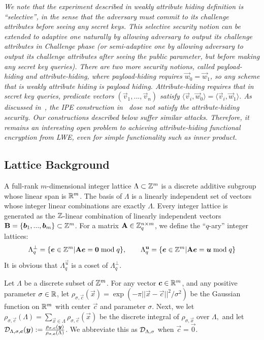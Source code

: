 \begin{remark}\label{rem:sec}
\emph{
We note that the experiment described in weakly attribute hiding definition is ``selective'', in the sense that the adversary must commit to its challenge attributes before seeing any secret keys. This selective security notion can be extended to adaptive one naturally by allowing adversary to output its challenge attributes in Challenge phase (or semi-adaptive one by allowing adversary to output its challenge attributes after seeing the public parameter, but before making any secret key queries). There are two more security notions, called {\em payload-hiding} and {\em attribute-hiding}, where payload-hiding requires $\vec{w}_0 = \vec{w}_1$, so any scheme that is weakly attribute hiding is payload hiding. Attribute-hiding requires that in secret key queries, predicate vectors $(\vec{v}_1,..., \vec{v}_n)$ satisfy $\langle \vec{v}_i, \vec{w}_0 \rangle = \langle \vec{v}_i, \vec{w}_1 \rangle$. As discussed in~\cite{cryptoeprint:2016:654}, the IPE construction in~\cite{AC:AgrFreVai11} dose not satisfy the attribute-hiding security. Our constructions described below suffer similar attacks. Therefore, it remains an interesting open problem to achieving attribute-hiding functional encryption from LWE, even for simple functionality such as inner product.
}
\end{remark}


\subsection{Lattice Background}
A full-rank $m$-dimensional integer lattice $\Lambda\subset\mathbb{Z}^m$ is a discrete additive subgroup whose linear span is $\mathbb{R}^m$. The basis of $\Lambda$ is a linearly independent set of vectors whose integer linear combinations are exactly $\Lambda$. Every integer lattice is generated as the $\mathbb{Z}$-linear combination of linearly independent vectors $\mathbf{B}=\{\boldsymbol{b}_1,...,\boldsymbol{b}_m\}\subset\mathbb{Z}^m$. For a matrix $\mathbf{A}\in\mathbb{Z}^{n\times m}_q$, we define the ``$q$-ary'' integer lattices:
$$\Lambda_q^{\bot}=\{\boldsymbol{e} \in \mathbb{Z}^m| \mathbf{A} \boldsymbol{e} = \boldsymbol{0} \bmod q\},\qquad  \Lambda_q^{\mathbf{u}}=\{\boldsymbol{e}\in\mathbb{Z}^m|\mathbf{A}\boldsymbol{e} = \boldsymbol{u} \bmod q\}$$
It is obvious that $\Lambda_q^{\vec{u}}$ is a coset of $\Lambda_q^{\bot}$.

Let $\Lambda$ be a discrete subset of $\mathbb{Z}^m$. For any vector $\boldsymbol{c}\in\mathbb{R}^m$, and any positive parameter $\sigma\in\mathbb{R}$, let $\rho_{\sigma, \vec{c}}(\vec{x})=\exp(-\pi||\vec{x}-\vec{c}||^2 / \sigma^2)$ be the Gaussian function on $\mathbb{R}^m$ with center $\vec{c}$ and parameter $\sigma$. Next, we let $\rho_{\sigma, \vec{c}}(\Lambda)=\sum_{\vec{x}\in\Lambda}\rho_{\sigma, \vec{c}}(\vec{x})$ be the discrete integral of $\rho_{\sigma, \vec{x}}$ over $\Lambda,$ and let $\mathcal{D}_{\Lambda, \sigma, \boldsymbol{c}}(\boldsymbol{y}):=\frac{\rho_{\sigma, \boldsymbol{c}}(\boldsymbol{y})}{\rho_{\sigma, \boldsymbol{c}}(\Lambda)}$. We abbreviate this as $\mathcal{D}_{\Lambda, \sigma}$ when $\vec{c}=\vec{0}.$

